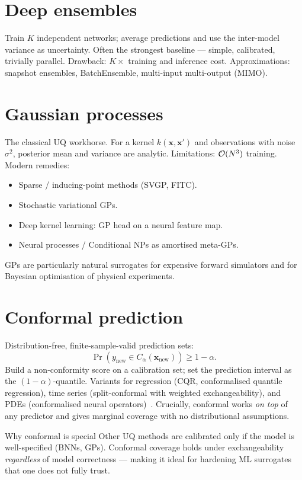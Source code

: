 \section{Deep ensembles}
Train $K$ independent networks; average predictions and use the
inter-model variance as uncertainty. Often the strongest baseline ---
simple, calibrated, trivially parallel. Drawback: $K\times$ training
and inference cost. Approximations: snapshot ensembles, BatchEnsemble,
multi-input multi-output (MIMO).

\section{Gaussian processes}
The classical UQ workhorse. For a kernel $k(\bm{x},\bm{x}')$ and
observations with noise $\sigma^2$, posterior mean and variance are
analytic. Limitations: $\mathcal{O}(N^3)$ training. Modern remedies:
\begin{itemize}
\item Sparse / inducing-point methods (SVGP, FITC).
\item Stochastic variational GPs.
\item Deep kernel learning: GP head on a neural feature map.
\item Neural processes / Conditional NPs as amortised meta-GPs.
\end{itemize}
GPs are particularly natural surrogates for expensive forward simulators
and for Bayesian optimisation of physical experiments.

\section{Conformal prediction}
Distribution-free, finite-sample-valid prediction sets:
\begin{equation}
\Pr(y_{\text{new}}\in C_\alpha(\bm{x}_{\text{new}}))\ge 1-\alpha.
\end{equation}
Build a non-conformity score on a calibration set; set the prediction
interval as the $(1-\alpha)$-quantile. Variants for regression
(CQR, conformalised quantile regression), time series (split-conformal
with weighted exchangeability), and PDEs (conformalised neural
operators)~\cite{ma2024conformal}. Crucially, conformal works
\emph{on top} of any predictor and gives marginal coverage with no
distributional assumptions.

\begin{insight}{Why conformal is special}
Other UQ methods are calibrated only if the model is well-specified
(BNNs, GPs). Conformal coverage holds under exchangeability
\emph{regardless} of model correctness --- making it ideal for
hardening ML surrogates that one does not fully trust.
\end{insight}

